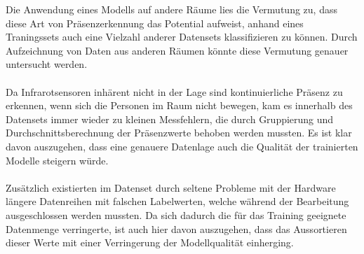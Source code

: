 \newpage

Die Anwendung eines Modells auf andere Räume lies die Vermutung zu, dass diese Art von Präsenzerkennung das 
Potential aufweist, anhand eines Traningssets auch eine Vielzahl anderer Datensets klassifizieren zu können.
Durch Aufzeichnung von Daten aus anderen Räumen könnte diese Vermutung genauer untersucht werden.  \\\\
Da Infrarotsensoren inhärent nicht in der Lage sind kontinuierliche Präsenz zu erkennen, wenn sich die Personen
im Raum nicht bewegen, kam es innerhalb des Datensets immer wieder zu kleinen Messfehlern, die durch Gruppierung
und Durchschnittsberechnung der Präsenzwerte behoben werden mussten. Es ist klar davon auszugehen, dass eine 
genauere Datenlage auch die Qualität der trainierten Modelle steigern würde.\\\\
Zusätzlich existierten im Datenset durch seltene Probleme mit der Hardware längere Datenreihen mit falschen 
Labelwerten, welche während der Bearbeitung ausgeschlossen werden mussten. Da sich dadurch die für das Training 
geeignete Datenmenge verringerte, ist auch hier davon auszugehen, dass das Aussortieren dieser Werte
mit einer Verringerung der Modellqualität einherging. 
